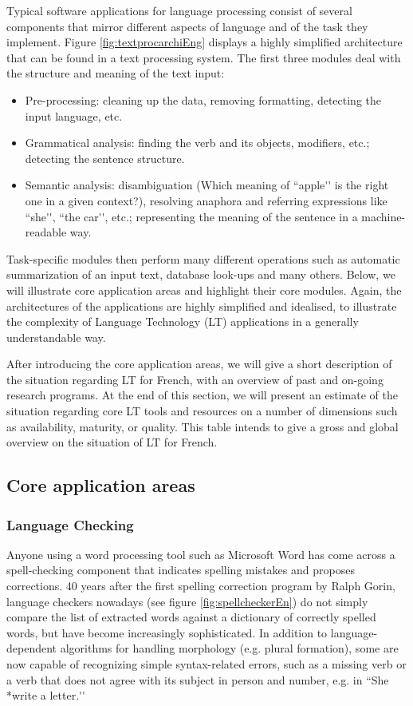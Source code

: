 \begin{multicols}{2}
Typical software applications for language processing consist of
several components that mirror different aspects of language and of
the task they implement. Figure \ref{fig:textprocarchiEng} displays a highly
simplified architecture that can be found in a text processing
system. The first three modules deal with the structure and meaning of
the text input:
\begin{itemize}
\item Pre-processing: cleaning up the data, removing formatting,
  detecting the input language, etc.
\item Grammatical analysis: finding the verb and its objects,
  modifiers, etc.; detecting the sentence structure.
\item Semantic analysis: disambiguation (Which meaning of ``apple{\mbox '}{\mbox '} is the
  right one in a given context?), resolving anaphora and referring
  expressions like ``she{\mbox '}{\mbox '}, ``the car{\mbox '}{\mbox '}, etc.; representing the meaning of the
  sentence in a machine-readable way.
\end{itemize}

Task-specific modules then perform many different operations such as
automatic summarization of an input text, database look-ups and many
others. Below, we will illustrate core application areas and highlight
their core modules. Again, the architectures of the applications are
highly simplified and idealised, to illustrate the complexity of
Language Technology (LT) applications in a generally understandable
way.



After introducing the core application areas, we will give a short
description of the situation regarding LT for French, with an overview
of past and on-going research programs. At the end of this section, we
will present an estimate of the situation regarding core LT tools and
resources on a number of dimensions such as availability, maturity, or
quality. This table intends to give a gross and global overview on the
situation of LT for French.

\subsection{Core application areas}

\subsubsection{Language Checking}
Anyone using a word processing tool such as Microsoft Word has come
across a spell-checking component that indicates spelling mistakes and
proposes corrections. 40 years after the first spelling correction
program by Ralph Gorin, language checkers nowadays (see figure
\ref{fig:spellcheckerEn}) do not simply compare the list of extracted
words against a dictionary of correctly spelled words, but have become
increasingly sophisticated. In addition to language-dependent
algorithms for handling morphology (e.g. plural formation), some are
now capable of recognizing simple syntax-related errors, such as a
missing verb or a verb that does not agree with its subject in person
and number, e.g. in ``She *write a letter.{\mbox '}{\mbox '}


\end{multicols}
